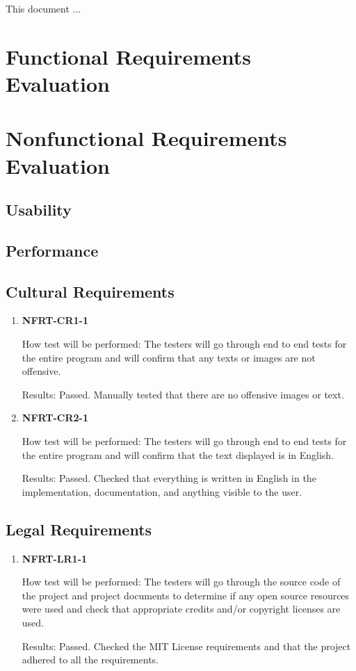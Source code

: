 \documentclass[12pt, titlepage]{article}
\begin{document}

This document ...

\section{Functional Requirements Evaluation}

\section{Nonfunctional Requirements Evaluation}

\subsection{Usability}

\subsection{Performance}

\subsection{Cultural Requirements}
\begin{enumerate}
	\item \textbf{NFRT-CR1-1}

	      How test will be performed: The testers will go through end to end tests for the entire program and
	      will confirm that any texts or images are not offensive.

	      Results: Passed. Manually tested that there are no offensive images or text.

	\item \textbf{NFRT-CR2-1}

	      How test will be performed: The testers will go through end to end tests for the entire program and
	      will confirm that the text displayed is in English.

	      Results: Passed. Checked that everything is written in English in the implementation,
	      documentation, and anything visible to the user.

\end{enumerate}

\subsection{Legal Requirements}
\begin{enumerate}
	\item \textbf{NFRT-LR1-1}

	      How test will be performed: The testers will go through the source code of the project and project
	      documents to determine if any open source resources were used and check that appropriate credits
	      and/or copyright licenses are used.

	      Results: Passed. Checked the MIT License requirements and that the project adhered to all the
	      requirements.

\end{enumerate}
\end{document}
